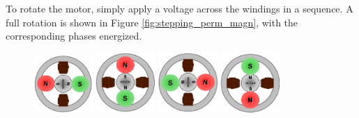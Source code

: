 \newpage
To rotate the motor, simply apply a voltage across the windings in a sequence. A full rotation is 
shown in Figure \ref{fig:stepping_perm_magn}, with the corresponding phases energized.

\begin{figure}[htp]
    \begin{center}
    \includegraphics[width=0.2\textwidth]{figures/move/motor9.png}    
    \hfill
    \includegraphics[width=0.2\textwidth]{figures/move/motor10.png}
    \hfill
    \includegraphics[width=0.2\textwidth]{figures/move/motor11.png}
  	\hfill
  	\includegraphics[width=0.2\textwidth]{figures/move/motor12.png}
    \end{center}
\end{figure}
\vspace{-10mm}
